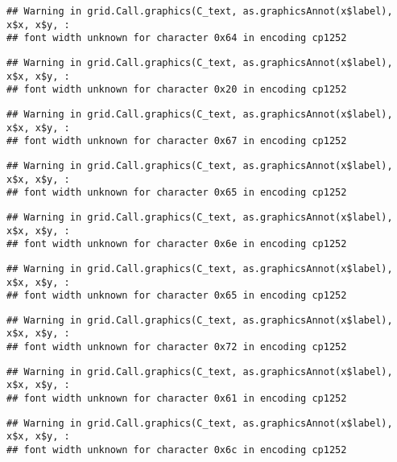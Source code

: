 \documentclass[
]{article}
\begin{document}
\begin{verbatim}
## Warning in grid.Call.graphics(C_text, as.graphicsAnnot(x$label), x$x, x$y, :
## font width unknown for character 0x64 in encoding cp1252
\end{verbatim}

\begin{verbatim}
## Warning in grid.Call.graphics(C_text, as.graphicsAnnot(x$label), x$x, x$y, :
## font width unknown for character 0x20 in encoding cp1252
\end{verbatim}

\begin{verbatim}
## Warning in grid.Call.graphics(C_text, as.graphicsAnnot(x$label), x$x, x$y, :
## font width unknown for character 0x67 in encoding cp1252
\end{verbatim}

\begin{verbatim}
## Warning in grid.Call.graphics(C_text, as.graphicsAnnot(x$label), x$x, x$y, :
## font width unknown for character 0x65 in encoding cp1252
\end{verbatim}

\begin{verbatim}
## Warning in grid.Call.graphics(C_text, as.graphicsAnnot(x$label), x$x, x$y, :
## font width unknown for character 0x6e in encoding cp1252
\end{verbatim}

\begin{verbatim}
## Warning in grid.Call.graphics(C_text, as.graphicsAnnot(x$label), x$x, x$y, :
## font width unknown for character 0x65 in encoding cp1252
\end{verbatim}

\begin{verbatim}
## Warning in grid.Call.graphics(C_text, as.graphicsAnnot(x$label), x$x, x$y, :
## font width unknown for character 0x72 in encoding cp1252
\end{verbatim}

\begin{verbatim}
## Warning in grid.Call.graphics(C_text, as.graphicsAnnot(x$label), x$x, x$y, :
## font width unknown for character 0x61 in encoding cp1252
\end{verbatim}

\begin{verbatim}
## Warning in grid.Call.graphics(C_text, as.graphicsAnnot(x$label), x$x, x$y, :
## font width unknown for character 0x6c in encoding cp1252
\end{verbatim}
\end{document}
